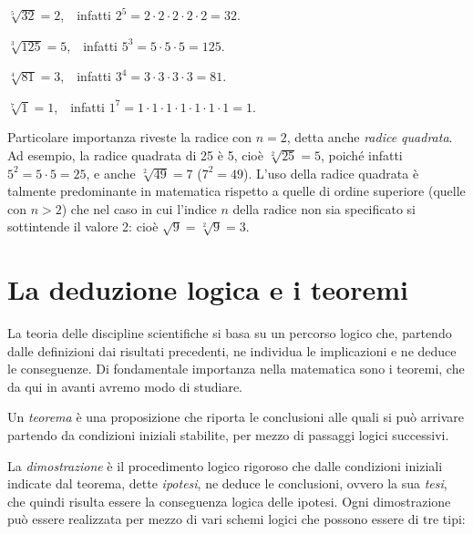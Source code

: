 \begin{exrig}
 \begin{esempio}
$\sqrt[5]{32} = 2$,~~infatti $2^5 = 2\cdot 2\cdot 2\cdot 2\cdot 2 = 32$.
 \end{esempio}

 \begin{esempio}
$\sqrt[3]{125} = 5$,~~infatti $5^3 = 5\cdot 5\cdot 5 = 125$.
 \end{esempio}

 \begin{esempio}
$\sqrt[4]{81} = 3$,~~infatti $3^4 = 3\cdot 3\cdot 3\cdot 3 = 81$.
 \end{esempio}

 \begin{esempio}
$\sqrt[7]{1} = 1$,~~infatti $1^7 = 1\cdot 1\cdot 1\cdot 1\cdot 1\cdot 1\cdot 1 = 1$.
 \end{esempio}
\end{exrig}

Particolare importanza riveste la radice con $n=2$, detta anche \emph{radice quadrata}. Ad esempio, la radice quadrata di 25 è 5, cioè $\sqrt[2]{25} = 5$, poiché infatti~$5^2 = 5\cdot 5=25$, e anche $\sqrt[2]{49} = 7$ ($7^2=49$). L'uso della radice quadrata è talmente predominante in matematica rispetto a quelle di ordine superiore (quelle con $n>2$) che nel caso in cui l'indice $n$ della radice non sia specificato si sottintende il valore 2: cioè $\sqrt{9} = \sqrt[2]{9} = 3$.


\section{La deduzione logica e i teoremi}

La teoria delle discipline scientifiche si basa su un percorso logico che, partendo dalle definizioni dai risultati precedenti, ne individua le implicazioni e ne deduce le conseguenze. Di fondamentale importanza nella matematica sono i teoremi, che da qui in avanti avremo modo di studiare.

Un \emph{teorema} è una proposizione che riporta le conclusioni alle quali si può arrivare partendo da condizioni iniziali stabilite, per mezzo di passaggi logici successivi.

La \emph{dimostrazione} è il procedimento logico rigoroso che dalle condizioni iniziali indicate dal teorema, dette \emph{ipotesi}, ne deduce le conclusioni, ovvero la sua \emph{tesi}, che quindi risulta essere la conseguenza logica delle ipotesi.
Ogni dimostrazione può essere realizzata per mezzo di vari schemi logici che possono essere di tre tipi:

